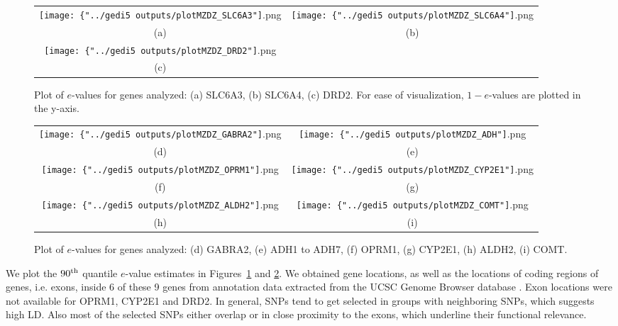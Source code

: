 \begin{figure}[b]
\begin{center}
%
\begin{tabular}{cc}
		\texttt{[image: \{"../gedi5 outputs/plotMZDZ\_SLC6A3"]}.png} &
		\texttt{[image: \{"../gedi5 outputs/plotMZDZ\_SLC6A4"]}.png} \\
		(a) & (b)\\
		\texttt{[image: \{"../gedi5 outputs/plotMZDZ\_DRD2"]}.png} &\\
		(c) &\\	
\end{tabular}
%
\caption{Plot of $e$-values for genes analyzed: (a) SLC6A3, (b) SLC6A4, (c) DRD2. For ease of visualization, $1 - e$-values are plotted in the y-axis.}
\label{fig:geneplot3}

\end{center}
\end{figure}

\begin{figure}[b]
\begin{center}
%
\begin{tabular}{cc}
		\texttt{[image: \{"../gedi5 outputs/plotMZDZ\_GABRA2"]}.png} &
		\texttt{[image: \{"../gedi5 outputs/plotMZDZ\_ADH"]}.png} \\
		(d) & (e)\\	
		\texttt{[image: \{"../gedi5 outputs/plotMZDZ\_OPRM1"]}.png} &
		\texttt{[image: \{"../gedi5 outputs/plotMZDZ\_CYP2E1"]}.png} \\
		(f) & (g)\\	
		\texttt{[image: \{"../gedi5 outputs/plotMZDZ\_ALDH2"]}.png} &
		\texttt{[image: \{"../gedi5 outputs/plotMZDZ\_COMT"]}.png}\\
		(h) & (i)\\
\end{tabular}
%
\caption{Plot of $e$-values for genes analyzed: (d) GABRA2, (e) ADH1 to ADH7, (f) OPRM1, (g) CYP2E1, (h) ALDH2, (i) COMT.}
\label{fig:geneplot1}
\end{center}
\end{figure}

We plot the $90^{\operatorname*{\text{th}}}$ quantile $e$-value estimates in Figures~\ref{fig:geneplot3} and \ref{fig:geneplot1}. We obtained gene locations, as well as the locations of coding regions of genes, i.e. exons, inside 6 of these 9 genes from annotation data extracted from the UCSC Genome Browser database \citep{UCSCdata}. Exon locations were not available for OPRM1, CYP2E1 and DRD2. In general, SNPs tend to get selected in groups with neighboring SNPs, which suggests high LD. Also most of the selected SNPs either overlap or in close proximity to the exons, which underline their functional relevance.